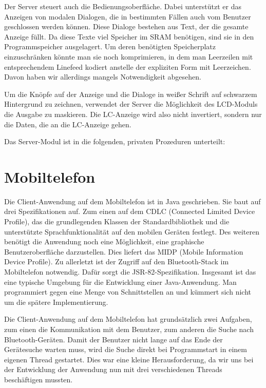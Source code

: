 \documentclass[ngerman]{article}
\begin{document}
Der Server steuert auch die Bedienungsoberfläche. Dabei unterstützt er das
Anzeigen von modalen Dialogen, die in bestimmten Fällen auch vom Benutzer
geschlossen werden können. Diese Dialoge bestehen aus Text, der die gesamte
Anzeige füllt. Da diese Texte viel Speicher im SRAM benötigen, sind sie in
den Programmspeicher ausgelagert. Um deren benötigten Speicherplatz 
ein\-zu\-schrän\-ken könnte man sie noch komprimieren, in dem man Leerzeilen mit
entsprechendem Linefeed kodiert anstelle der expliziten Form mit
Leerzeichen. Davon haben wir allerdings mangels Notwendigkeit abgesehen.

Um die Knöpfe auf der Anzeige und die Dialoge in weißer Schrift auf
schwarzem Hintergrund zu zeichnen, verwendet der Server die Möglichkeit
des LCD-Moduls die Ausgabe zu maskieren. Die LC-Anzeige wird also nicht
invertiert, sondern nur die Daten, die an die LC-Anzeige gehen.

Das Server-Modul ist in die folgenden, privaten Prozeduren unterteilt:



\section{Mobiltelefon}

Die Client-Anwendung auf dem Mobiltelefon ist in Java geschrieben. Sie baut
auf drei Spezifikationen auf. Zum einen auf dem CDLC (Connected Limited Device Profile), 
das die grundlegenden Klassen der Standardbibliothek und die unterstützte
Sprachfunktionalität auf den mobilen Geräten festlegt. Des weiteren benötigt
die Anwendung noch eine Möglichkeit, eine graphische Benutzeroberfläche 
darzustellen. Dies liefert das MIDP (Mobile Information Device Profile). Zu
allerletzt ist der Zugriff auf den Bluetooth-Stack im Mobiltelefon notwendig.
Dafür sorgt die JSR-82-Spezifikation. Insgesamt ist das eine typische Umgebung
für die Entwicklung einer Java-Anwendung. Man programmiert gegen eine Menge
von Schnittstellen an und kümmert sich nicht um die spätere Implementierung.

Die Client-Anwendung auf dem Mobiltelefon hat grundsätzlich zwei Aufgaben, zum
einen die Kommunikation mit dem Benutzer, zum anderen die Suche nach 
Bluetooth-Geräten. Damit der Benutzer nicht lange auf das Ende der Gerätesuche
warten muss, wird die Suche direkt bei Programmstart in einem eigenen Thread
gestartet. Dies war eine kleine Herausforderung, da wir uns bei der
Entwicklung der Anwendung nun mit drei verschiedenen Threads beschäftigen mussten.
\end{document}
